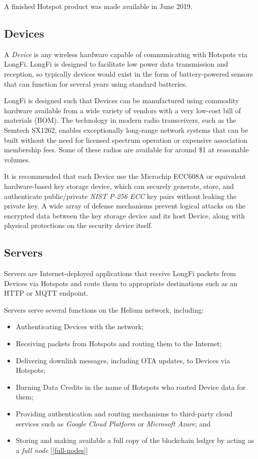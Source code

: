 \documentclass[10pt, nonatbib, nocopyrightspace, reprint]{sigplanconf}
\newcommand{\secref}[1]{[\autoref{#1}]}
\begin{document}
A finished Hotspot product was made available in June 2019.

\subsection{Devices}\label{devices}

A \emph{Device} is any wireless hardware capable of communicating with Hotspots via LongFi. LongFi is designed to facilitate low power data transmission and reception, so typically devices would exist in the form of battery-powered sensors that can function for several years using standard batteries.

LongFi is designed such that Devices can be manufactured using commodity hardware available from a wide variety of vendors with a very low-cost bill of materials (BOM). The technology in modern radio transceivers, such as the Semtech SX1262, enables exceptionally long-range network systems that can be built without the need for licensed spectrum operation or expensive association membership fees. Some of these radios are available for around \$1 at reasonable volumes.

It is recommended that each Device use the Microchip ECC608A or equivalent hardware-based key storage device, which can securely generate, store, and authenticate public/private \emph{NIST P-256 ECC} \cite{nist} key pairs without leaking the private key. A wide array of defense mechanisms prevent logical attacks on the encrypted data between the key storage device and its host Device, along with physical protections on the security device itself.

\subsection{Servers}

Servers are Internet-deployed applications that receive LongFi packets from Devices via Hotspots and route them to appropriate destinations such as an HTTP or MQTT endpoint.

Servers serve several functions on the Helium network, including:

\begin{itemize}
    \item Authenticating Devices with the network;
    \item Receiving packets from Hotspots and routing them to the Internet;
    \item Delivering downlink messages, including OTA updates, to Devices via Hotspots;
    \item Burning Data Credits in the name of Hotspots who routed Device data for them;
    \item Providing authentication and routing mechanisms to third-party cloud services such as \emph{Google Cloud Platform} or \emph{Microsoft Azure}; and
    \item Storing and making available a full copy of the blockchain ledger by acting as a \emph{full node} \secref{full-nodes}
\end{itemize}
\end{document}
